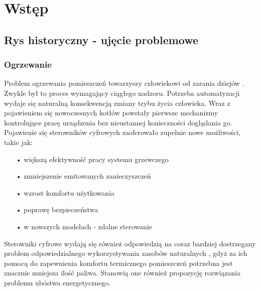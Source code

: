 \documentclass[11pt]{report}
\begin{document}
 \begin{titlepage}
 \vspace{0.1\textheight}
 \bigskip
 \vspace{0.3\textheight}
 \par

 \vspace{0.1\textheight}
 \end{titlepage}


 \tableofcontents


 \chapter{Wstęp}
 \section{Rys historyczny - ujęcie problemowe}
 \subsection{Ogrzewanie}
 Problem ogrzewania pomieszczeń towarzyszy człowiekowi od zarania dziejów \cite{Hoppe2018}. Zwykle był to proces wymagający ciągłego nadzoru. Potrzeba automatyzacji wydaje się naturalną konsekwencją zmiany trybu życia człowieka. Wraz z pojawieniem się nowoczesnych kotłów powstały pierwsze mechanizmy kontrolujące pracę urządzenia bez nieustannej konieczności doglądania go.
 Pojawienie się sterowników cyfrowych zaoferowało zupełnie nowe możliwości, takie jak:
  \begin{enumerate}
 \item[•] większą efektywność pracy systemu grzewczego
 \item[•] zmniejszenie emitowanych zanieczyszczeń
 \item[•] wzrost komfortu użytkowania
 \item[•] poprawę bezpieczeństwa
 \item[•] w nowszych modelach - zdalne sterowanie
  \end{enumerate}
 Sterowniki cyfrowe wydają się również odpowiedzią na coraz bardziej dostrzegany problem odpowiedzialnego wykorzystywania zasobów naturalnych \cite{Mazurek2018}\cite{Mazurek2018a}, gdyż za ich pomocą do zapewnienia komfortu termicznego pomieszczeń potrzebna jest znacznie mniejsza ilość paliwa. Stanowią one również propozycję rozwiązania problemu ubóstwa energetycznego.
\end{document}
